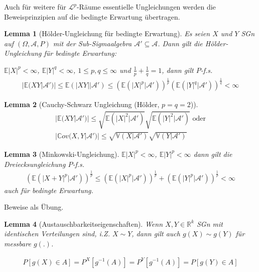 \documentclass[]{article}
\newtheorem{lemma}{Lemma}
\begin{document}
Auch für weitere für $\mathcal{L}^p$-Räume essentielle Ungleichungen werden die Beweisprinzipien auf die bedingte Erwartung übertragen.

\begin{lemma}[Hölder-Ungleichung für bedingte Erwartung]
	Es seien $X$ und $Y$ SGn auf $(\Omega, \mathcal{A}, P)$ mit der Sub-Sigmaalgebra $\mathcal{A}'\subseteq \mathcal{A}$. Dann gilt die Hölder-Ungleichung für bedingte Erwartung:
	
	$\mathbb{E}|X|^p <\infty$, $\mathbb{E}|Y|^q < \infty$, $1\leq p,q \leq \infty$ und $\frac{1}{p} + \frac{1}{q} = 1$, dann gilt $P$-f.s.
	\begin{align*}
		|\mathbb{E}(XY|\mathcal{A}')| \leq \mathbb{E}(|XY| | \mathcal{A}') \leq (\mathbb{E}(|X|^p|\mathcal{A}'))^{\frac{1}{p}} (\mathbb{E}(|Y|^q|\mathcal{A}'))^{\frac{1}{q}} < \infty
	\end{align*}
\end{lemma}

\begin{lemma}[Cauchy-Schwarz Ungleichung (Hölder, $p=q=2$)]
	\begin{align*}
		|\mathbb{E}(XY|\mathcal{A}')| \leq \sqrt{\mathbb{E}(|X|^2|\mathcal{A}')} \sqrt{\mathbb{E}(|Y|^2|\mathcal{A}')} \text{ oder}\\
		|\mathbb{C}ov(X,Y|\mathcal{A}')| \leq \sqrt{\mathbb{V}(X|\mathcal{A}')} \sqrt{\mathbb{V}(Y|\mathcal{A}')}
	\end{align*}
\end{lemma}

\begin{lemma}[Minkowski-Ungleichung]
	$\mathbb{E}|X|^p <\infty$, $\mathbb{E}|Y|^p < \infty$ dann gilt die Dreiecksungleichung $P$-f.s.
	\begin{align*}
		(\mathbb{E}(|X+Y|^p |\mathcal{A}'))^{\frac{1}{p}} \leq (\mathbb{E}(|X|^p |\mathcal{A}'))^{\frac{1}{p}} + (\mathbb{E}(|Y|^p |\mathcal{A}'))^{\frac{1}{p}} < \infty
	\end{align*}
	auch für bedingte Erwartung.
\end{lemma}

Beweise als Übung.

\begin{lemma}[Austauschbarkeitseigenschaften]
	Wenn $X,Y\in \mathbb{R}^k$ SGn mit identischen Verteilungen sind, i.Z. $X\sim Y$, dann gilt auch $g(X) \sim g(Y)$ für messbare $g(.)$.
\end{lemma}
\begin{align*}
	P[g(X)\in A] = P^X[g^{-1}(A)] = P^Y[g^{-1}(A)] = P[g(Y)\in A]
\end{align*}
\end{document}
